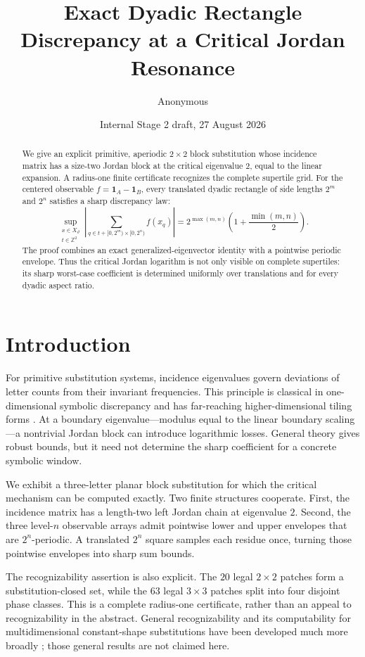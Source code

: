 \documentclass[11pt,a4paper]{amsart}
\title[Critical-Jordan rectangle discrepancy]{Exact Dyadic Rectangle Discrepancy at a Critical Jordan Resonance}
\author{Anonymous}
\date{Internal Stage 2 draft, 27 August 2026}
\theoremstyle{definition}
\theoremstyle{remark}
\newcommand{\Z}{\mathbb Z}
\begin{document}
\begin{abstract}
We give an explicit primitive, aperiodic $2\times2$ block substitution whose
incidence matrix has a size-two Jordan block at the critical eigenvalue $2$,
equal to the linear expansion.  A radius-one finite certificate recognizes
the complete supertile grid.  For the centered observable
$f=\mathbf1_A-\mathbf1_B$, every translated dyadic rectangle of side lengths
$2^m$ and $2^n$ satisfies a sharp discrepancy law:
\[
 \sup_{\substack{x\in X_\vartheta\\t\in\Z^2}}
 \left|\sum_{q\in t+[0,2^m)\times[0,2^n)}f(x_q)\right|
 =2^{\max(m,n)}\left(1+\frac{\min(m,n)}2\right).
\]
The proof combines an exact generalized-eigenvector identity with a
pointwise periodic envelope.  Thus the critical Jordan logarithm is not only
visible on complete supertiles: its sharp worst-case coefficient is determined
uniformly over translations and for every dyadic aspect ratio.
\end{abstract}

\maketitle

\section{Introduction}

For primitive substitution systems, incidence eigenvalues govern deviations
of letter counts from their invariant frequencies.  This principle is
classical in one-dimensional symbolic discrepancy
\cite{Adamczewski2004} and has far-reaching higher-dimensional tiling forms
\cite{BufetovSolomyak2013}.  At a boundary eigenvalue---modulus equal to the
linear boundary scaling---a nontrivial Jordan block can introduce logarithmic
losses.  General theory gives robust bounds, but it need not determine the
sharp coefficient for a concrete symbolic window.

We exhibit a three-letter planar block substitution for which the critical
mechanism can be computed exactly.  Two finite structures cooperate.  First,
the incidence matrix has a length-two left Jordan chain at eigenvalue $2$.
Second, the three level-$n$ observable arrays admit pointwise lower and upper
envelopes that are $2^n$-periodic.  A translated $2^n$ square samples each
residue once, turning those pointwise envelopes into sharp sum bounds.

The recognizability assertion is also explicit.  The $20$ legal $2\times2$
patches form a substitution-closed set, while the $63$ legal $3\times3$
patches split into four disjoint phase classes.  This is a complete
radius-one certificate, rather than an appeal to recognizability in the
abstract.  General recognizability and its computability for
multidimensional constant-shape substitutions have been developed much more
broadly \cite{Solomyak1998,Cabezas2023,CabezasLeroy2025}; those general results
are not claimed here.
\end{document}
